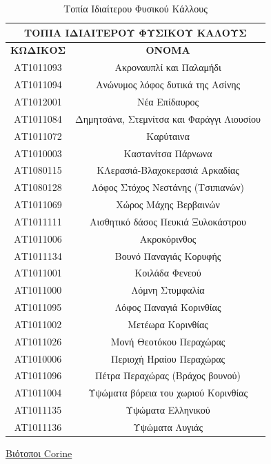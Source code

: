 \documentclass[12pt]{article}
\newcommand{\gr}{\selectlanguage{greek}}
\newcommand{\eng}{\selectlanguage{english}}
\begin{document}
	\begin{table}[H]
		\centering
		\begin{tabular}{|c|c|}
			\hline
			\multicolumn{2}{|c|}{\textbf{ΤΟΠΙΑ ΙΔΙΑΙΤΕΡΟΥ ΦΥΣΙΚΟΥ ΚΑΛΟΥΣ}} \\ \hline
			\textbf{ΚΩΔΙΚΟΣ} & \textbf{ΟΝΟΜΑ} \\ \hline
			ΑΤ1011093 & Ακροναυπλί και Παλαμήδι \\ \hline
			ΑΤ1011094 & Ανώνυμος λόφος δυτικά της Ασίνης \\ \hline
			ΑΤ1012001 & Νέα Επίδαυρος \\ \hline
			ΑΤ1011084 & Δημητσάνα, Στεμνίτσα και Φαράγγι Λιουσίου \\ \hline
			ΑΤ1011072 & Καρύταινα \\ \hline
			ΑΤ1010003 & Καστανίτσα Πάρνωνα \\ \hline
			ΑΤ1080115 & ΚΛερασιά-Βλαχοκερασιά Αρκαδίας \\ \hline
			ΑΤ1080128 & Λόφος Στόχος Νεστάνης (Τσιπιανών) \\ \hline
			ΑΤ1011069 & Χώρος Μάχης Βερβαινών \\ \hline
			ΑΤ1011111 & Αισθητικό δάσος Πευκιά Ξυλοκάστρου \\ \hline
			ΑΤ1011006 & Ακροκόρινθος \\ \hline
			ΑΤ1011134 & Βουνό Παναγιάς Κορυφής \\ \hline
			ΑΤ1011001 & Κοιλάδα Φενεού \\ \hline
			AT1011000 & Λόμνη Στυμφαλία \\ \hline
			AT1011095 & Λόφος Παναγιά Κορινθίας \\ \hline
			AT1011002 & Μετέωρα Κορινθίας \\ \hline
			AT1011026 & Μονή Θεοτόκου Περαχώρας \\ \hline
			AT1010006 & Περιοχή Ηραίου Περαχώρας \\ \hline
			AT1011096 & Πέτρα Περαχώρας (Βράχος βουνού) \\ \hline
			AT1011004 & Υψώματα βόρεια του χωριού Κορινθίας \\ \hline
			AT1011135 & Υψώματα Ελληνικού \\ \hline
			AT1011136 & Υψώματα Λυγιάς \\ \hline
		\end{tabular}
		\caption{Τοπία Ιδιαίτερου Φυσικού Κάλλους}
		\label{The label}
	\end{table}
	
	\underline{Βιότοποι \eng Corine\gr}
	
\end{document}
